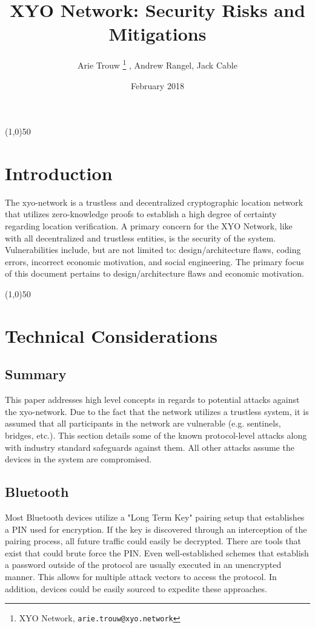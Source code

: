 \documentclass{article}
\title {XYO Network: Security Risks and Mitigations}
\author{
    Arie Trouw \thanks{XYO Network, \texttt{arie.trouw@xyo.network}} , Andrew Rangel, Jack Cable
}
\date{February 2018}
\begin{document}
\pagecolor{lightred}

\maketitle

\begin{center}
\line(1,0){50}
\end{center}

\section{Introduction}
The \Gls{xyo-network} is a \gls{trustless} and decentralized cryptographic location network that utilizes zero-knowledge proofs to establish a high degree of certainty regarding location verification. A primary concern for the XYO Network, like with all decentralized and trustless entities, is the security of the system.  Vulnerabilities include, but are not limited to: design/architecture flaws, coding errors, incorrect economic motivation, and social engineering. The primary focus of this document pertains to design/architecture flaws and economic motivation.

\begin{center}
\line(1,0){50}
\end{center}

\section {Technical Considerations}
\subsection{Summary}
This paper addresses high level concepts in regards to potential attacks against the \Gls{xyo-network}. Due to the fact that the network utilizes a \gls{trustless} system, it is assumed that all participants in the network are vulnerable (e.g. \Glspl{sentinel}, \Glspl{bridge}, etc.). This section details some of the known protocol-level attacks along with industry standard safeguards against them. All other attacks assume the devices in the system are compromised.

\subsection{Bluetooth}
Most Bluetooth devices utilize a "Long Term Key" pairing setup that establishes a PIN used for encryption. If the key is discovered through an interception of the pairing process, all future traffic could easily be decrypted. There are tools that exist that could brute force the PIN. Even well-established schemes that establish a password outside of the protocol are usually executed in an unencrypted manner. This allows for multiple attack vectors to access the protocol. In addition, devices could be easily sourced to expedite these approaches.
\end{document}
